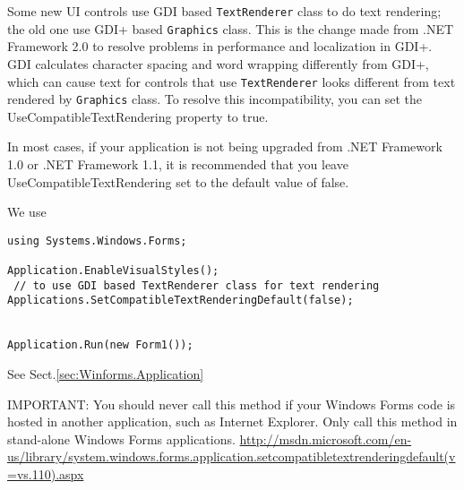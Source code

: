 Some new UI controls use GDI based \verb!TextRenderer! class to do text
rendering; the old one use GDI+ based \verb!Graphics! class. This is the change
made from .NET Framework 2.0 to resolve problems in performance
and localization in GDI+. GDI calculates character spacing and word wrapping
differently from GDI+, which can cause text for controls that use
\verb!TextRenderer! looks different from text rendered by \verb!Graphics! class.
To resolve this incompatibility, you can set the UseCompatibleTextRendering
property to true.  

In most cases, if your application is not being upgraded from .NET Framework
1.0 or .NET Framework 1.1, it is recommended that you leave
UseCompatibleTextRendering set to the default value of false. 

We use
\begin{verbatim}
using Systems.Windows.Forms;

Application.EnableVisualStyles();
 // to use GDI based TextRenderer class for text rendering
Applications.SetCompatibleTextRenderingDefault(false);


Application.Run(new Form1());
\end{verbatim}
See Sect.\ref{sec:Winforms.Application}

IMPORTANT: You should never call this method if your Windows Forms code is
hosted in another application, such as Internet Explorer. Only call this method
in stand-alone Windows Forms applications. 
\url{http://msdn.microsoft.com/en-us/library/system.windows.forms.application.setcompatibletextrenderingdefault(v=vs.110).aspx}